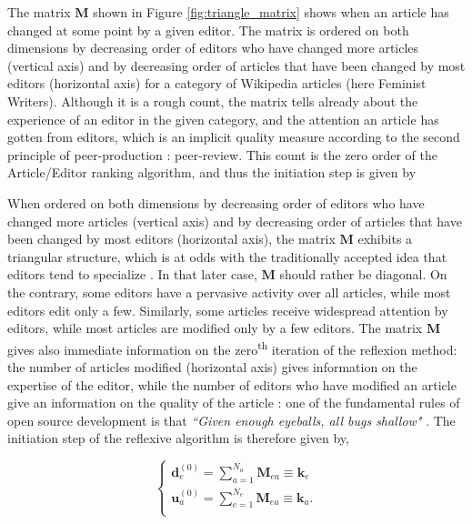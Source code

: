 The matrix $\mathbf{M}$ shown in Figure \ref{fig:triangle_matrix} shows when an article has changed at some point by a given editor. The matrix is ordered on both dimensions by decreasing order of editors who have changed more articles (vertical axis) and by decreasing order of articles that have been changed by most editors (horizontal axis) for a category of Wikipedia articles (here Feminist Writers). Although it is a rough count, the matrix tells already about the experience of an editor in the given category, and the attention an article has gotten from editors, which is an implicit quality measure according to the second principle of peer-production : peer-review. This count is the zero order of the Article/Editor ranking algorithm, and thus the initiation step is given by 

When ordered on both dimensions by decreasing order of editors who have changed more articles (vertical axis) and by decreasing order of articles that have been changed by most editors (horizontal axis), the matrix $\mathbf{M}$ exhibits a triangular structure, which is at odds with the traditionally accepted idea that editors tend to specialize \cite{}. In that later case, $\mathbf{M}$ should rather be diagonal. On the contrary, some editors have a pervasive activity over all articles, while most editors edit only a few. Similarly, some articles receive widespread attention by editors, while most articles are modified only by a few editors. The matrix $\mathbf{M}$ gives also immediate information on the zero\textsuperscript{th} iteration of the reflexion method: the number of articles modified (horizontal axis) gives information on the expertise of the editor, while the number of editors who have modified an article give an information on the quality of the article : one of the fundamental rules of open source development is that {\it ``Given enough eyeballs, all bugs shallow"} \cite{raymond1999}. The initiation step of the reflexive algorithm is therefore given by,

\begin{equation}
\begin{cases}
 \mathbf{d}_{e}^{(0)} = \sum_{a=1}^{N_{a}} \mathbf{M}_{ea} \equiv \mathbf{k}_e\\
 \mathbf{u}_{a}^{(0)} = \sum_{e=1}^{N_{e}} \mathbf{M}_{ea}  \equiv \mathbf{k}_a.\\
\end{cases}
\label{HHinit}
\end{equation}


